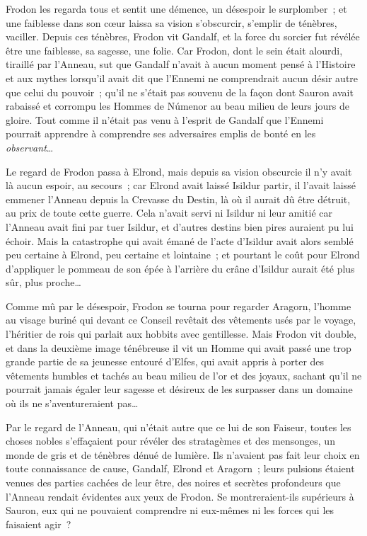 Frodon les regarda tous et sentit une démence, un désespoir le surplomber~; et une faiblesse dans son cœur laissa sa vision s'obscurcir, s'emplir de ténèbres, vaciller. Depuis ces ténèbres, Frodon vit Gandalf, et la force du sorcier fut révélée être une faiblesse, sa sagesse, une folie. Car Frodon, dont le sein était alourdi, tiraillé par l'Anneau, sut que Gandalf n'avait à aucun moment pensé à l'Histoire et aux mythes lorsqu'il avait dit que l'Ennemi ne comprendrait aucun désir autre que celui du pouvoir~; qu'il ne s'était pas souvenu de la façon dont Sauron avait rabaissé et corrompu les Hommes de Númenor au beau milieu de leurs jours de gloire. Tout comme il n'était pas venu à l'esprit de Gandalf que l'Ennemi pourrait apprendre à comprendre ses adversaires emplis de bonté en les \emph{observant}…

Le regard de Frodon passa à Elrond, mais depuis sa vision obscurcie il n'y avait là aucun espoir, au secours~; car Elrond avait laissé Isildur partir, il l'avait laissé emmener l'Anneau depuis la Crevasse du Destin, là où il aurait dû être détruit, au prix de toute cette guerre. Cela n'avait servi ni Isildur ni leur amitié car l'Anneau avait fini par tuer Isildur, et d'autres destins bien pires auraient pu lui échoir. Mais la catastrophe qui avait émané de l'acte d'Isildur avait alors semblé peu certaine à Elrond, peu certaine et lointaine~; et pourtant le coût pour Elrond d'appliquer le pommeau de son épée à l'arrière du crâne d'Isildur aurait été plus sûr, plus proche…

Comme mû par le désespoir, Frodon se tourna pour regarder Aragorn, l'homme au visage buriné qui devant ce Conseil revêtait des vêtements usés par le voyage, l'héritier de rois qui parlait aux hobbits avec gentillesse. Mais Frodon vit double, et dans la deuxième image ténébreuse il vit un Homme qui avait passé une trop grande partie de sa jeunesse entouré d'Elfes, qui avait appris à porter des vêtements humbles et tachés au beau milieu de l'or et des joyaux, sachant qu'il ne pourrait jamais égaler leur sagesse et désireux de les surpasser dans un domaine où ils ne s'aventureraient pas…

Par le regard de l'Anneau, qui n'était autre que ce lui de son Faiseur, toutes les choses nobles s'effaçaient pour révéler des stratagèmes et des mensonges, un monde de gris et de ténèbres dénué de lumière. Ils n'avaient pas fait leur choix en toute connaissance de cause, Gandalf, Elrond et Aragorn~; leurs pulsions étaient venues des parties cachées de leur être, des noires et secrètes profondeurs que l'Anneau rendait évidentes aux yeux de Frodon. Se montreraient-ils supérieurs à Sauron, eux qui ne pouvaient comprendre ni eux-mêmes ni les forces qui les faisaient agir~?

